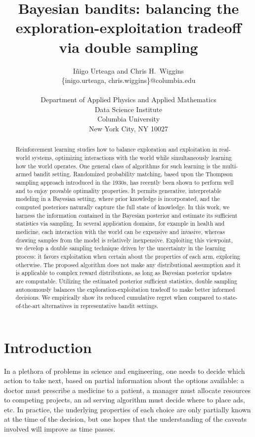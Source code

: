 \documentclass{article}
\title{Bayesian bandits: balancing the exploration-exploitation tradeoff via double sampling}
\author{ I\~{n}igo Urteaga and Chris H.~Wiggins\\
	{\sf \{inigo.urteaga, chris.wiggins\}@columbia.edu} \\\\
	Department of	Applied Physics and Applied Mathematics\\
	Data Science Institute\\
	Columbia University\\
	New York City, NY 10027
}
\begin{document}
	\maketitle

\begin{abstract}
Reinforcement learning studies how to balance exploration and exploitation in real-world systems, optimizing interactions with the world while simultaneously learning how the world operates. One general class of algorithms for such learning is the multi-armed bandit setting. Randomized probability matching, based upon the Thompson sampling approach introduced in the 1930s, has recently been shown to perform well and to enjoy provable optimality properties. It permits generative, interpretable modeling in a Bayesian setting, where prior knowledge is incorporated, and the computed posteriors naturally capture the full state of knowledge. In this work, we harness the information contained in the Bayesian posterior and estimate its sufficient statistics via sampling. In several application domains, for example in health and medicine, each interaction with the world can be expensive and invasive, whereas drawing samples from the model is relatively inexpensive. Exploiting this viewpoint, we develop a double sampling technique driven by the uncertainty in the learning process: it favors exploitation when certain about the properties of each arm, exploring otherwise. The proposed algorithm does not make any distributional assumption and it is applicable to complex reward distributions, as long as Bayesian posterior updates are computable. Utilizing the estimated posterior sufficient statistics, double sampling autonomously balances the exploration-exploitation tradeoff to make better informed decisions. We empirically show its reduced cumulative regret when compared to state-of-the-art alternatives in representative bandit settings.
\end{abstract}

\section{Introduction}
\label{sec:introduction}

In a plethora of problems in science and engineering, one needs to decide which action to take next, based on partial information about the options available: a doctor must prescribe a medicine to a patient, a manager must allocate resources to competing projects, an ad serving algorithm must decide where to place ads, etc. In practice, the underlying properties of each choice are only partially known at the time of the decision, but one hopes that the understanding of the caveats involved will improve as time passes.
\end{document}
